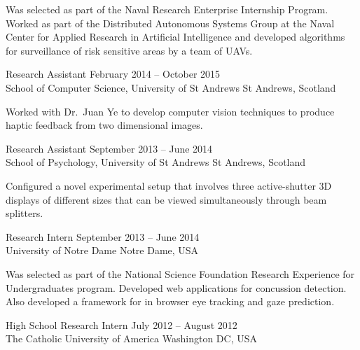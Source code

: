 \documentclass[line,margin]{cv}
\begin{document}
\begin{resume}
\begin{adjustwidth}{2.5em}{2.5em}
    Was selected as part of the Naval Research Enterprise Internship Program.
    Worked as part of the Distributed Autonomous Systems Group at the Naval
    Center for Applied Research in Artificial Intelligence and developed
    algorithms for surveillance of risk sensitive areas by a team of UAVs.

\end{adjustwidth}

Research Assistant
\hfill February 2014 -- October 2015 \\
School of Computer Science, University of St Andrews \hfill St Andrews,
Scotland

\begin{adjustwidth}{2.5em}{2.5em}

    Worked with Dr.\ Juan Ye to develop computer vision techniques to produce
    haptic feedback from two dimensional images.

\end{adjustwidth}

Research Assistant
\hfill September 2013 -- June 2014 \\
School of Psychology, University of St Andrews \hfill St Andrews, Scotland

\begin{adjustwidth}{2.5em}{2.5em}

    Configured a novel experimental setup that involves three active-shutter 3D
    displays of different sizes that can be viewed simultaneously through beam
    splitters.

\end{adjustwidth}

Research Intern
\hfill September 2013 -- June 2014 \\
University of Notre Dame \hfill Notre Dame, USA

\begin{adjustwidth}{2.5em}{2.5em}

    Was selected as part of the National Science Foundation Research Experience
    for Undergraduates program. Developed web applications for concussion
    detection. Also developed a framework for in browser eye tracking and gaze
    prediction.

\end{adjustwidth}

High School Research Intern
\hfill July 2012 -- August 2012 \\
The Catholic University of America \hfill Washington DC, USA

\begin{adjustwidth}{2.5em}{2.5em}


\end{adjustwidth}
\end{resume}
\end{document}
